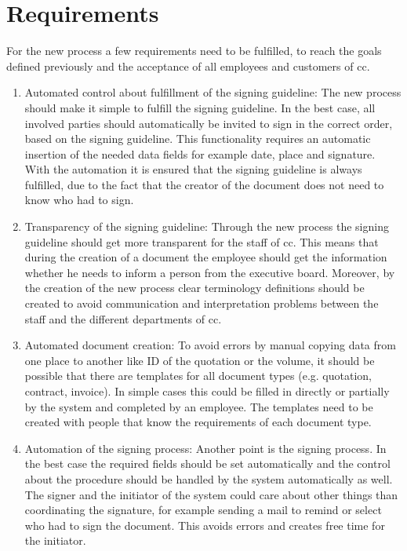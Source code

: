 \section{Requirements}
For the new process a few requirements need to be fulfilled, to reach the goals defined previously and the acceptance of all employees and customers of \gls{cc}.
\begin{enumerate}
	\item Automated control about fulfillment of the signing guideline: \newline
	The new process should make it simple to fulfill the signing guideline. In the best case, all involved parties should automatically be invited to sign in the correct order, based on the signing guideline. This functionality requires an automatic insertion of the needed data fields for example date, place and signature. With the automation it is ensured that the signing guideline is always fulfilled, due to the fact that the creator of the document does not need to know who had to sign.
	\item Transparency of the signing guideline: \newline
	Through the new process the signing guideline should get more transparent for the staff of \gls{cc}. This means that during the creation of a document the employee should get the information whether he needs to inform a person from the executive board. Moreover, by the creation of the new process clear terminology definitions should be created to avoid communication and interpretation problems between the staff and the different departments of \gls{cc}.
	\item Automated document creation: \newline 
	To avoid errors by manual copying data from one place to another like ID of the quotation or the volume, it should be possible that there are templates for all document types (e.g. quotation, contract, invoice). In simple cases this could be filled in directly or partially by the system and completed by an employee. The templates need to be created with people that know the requirements of each document type.
	\item Automation of the signing process: \newline
	Another point is the signing process. In the best case the required fields should be set automatically and the control about the procedure should be handled by the system automatically as well. The signer and the initiator of the system could care about other things than coordinating the signature, for example sending a mail to remind or select who had to sign the document. This avoids errors and creates free time for the initiator.

\end{enumerate}
